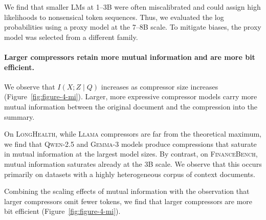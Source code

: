 \documentclass{article} %
\begin{document}
We find that smaller LMs at 1--3B were often miscalibrated and could assign high likelihoods to nonsensical token sequences. Thus, we evaluated the log probabilities using a proxy model at the 7--8B scale. To mitigate biases, the proxy model was selected from a different family.

\paragraph*{Larger compressors retain more mutual information and are more bit efficient.}
We observe that $I(X;Z \mid Q)$ increases as compressor size increases (Figure~\ref{fig:figure-4-mi}). Larger, more expressive compressor models carry more mutual information between the original document and the compression into the summary.

On \textsc{LongHealth}, while \textsc{Llama} compressors are far from the theoretical maximum, we find that \textsc{Qwen-2.5} and \textsc{Gemma-3} models produce compressions that saturate in mutual information at the largest model sizes. By contrast, on \textsc{FinanceBench}, mutual information saturates already at the 3B scale. We observe that this occurs primarily on datasets with a highly heterogeneous corpus of context documents.

Combining the scaling effects of mutual information with the observation that larger compressors omit fewer tokens, we find that larger compressors are more bit efficient (Figure~\ref{fig:figure-4-mi}).

\end{document}
